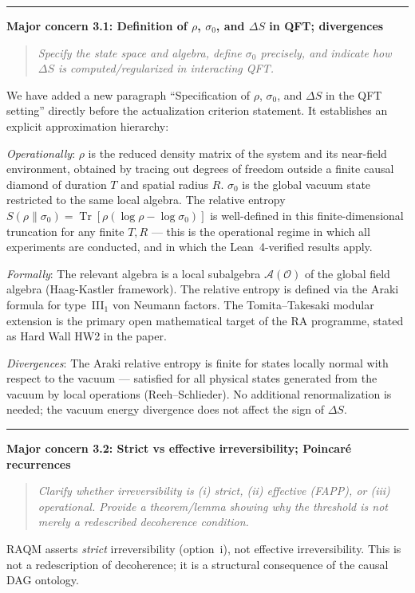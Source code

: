 \documentclass[11pt]{article}
\newcommand{\refereequote}[1]{%
  \begin{quote}\itshape\small #1\end{quote}}
\begin{document}
\bigskip\hrule\bigskip

\noindent\textbf{Major concern 3.1: Definition of $\rho$, $\sigma_0$,
and $\Delta S$ in QFT; divergences}

\refereequote{Specify the state space and algebra, define $\sigma_0$ precisely,
and indicate how $\Delta S$ is computed/regularized in interacting QFT.}

We have added a new paragraph ``Specification of $\rho$, $\sigma_0$, and
$\Delta S$ in the QFT setting'' directly before the actualization criterion
statement. It establishes an explicit approximation hierarchy:

\emph{Operationally}: $\rho$ is the reduced density matrix of the system and
its near-field environment, obtained by tracing out degrees of freedom outside
a finite causal diamond of duration $T$ and spatial radius $R$. $\sigma_0$
is the global vacuum state restricted to the same local algebra.
The relative entropy $S(\rho\|\sigma_0) = \operatorname{Tr}[\rho(\log\rho -
\log\sigma_0)]$ is well-defined in this finite-dimensional truncation for
any finite $T, R$ — this is the operational regime in which all experiments
are conducted, and in which the Lean~4-verified results apply.

\emph{Formally}: The relevant algebra is a local subalgebra $\mathcal{A}(\mathcal{O})$
of the global field algebra (Haag-Kastler framework). The relative entropy is
defined via the Araki formula for type~III$_1$ von Neumann factors. The
Tomita--Takesaki modular extension is the primary open mathematical target
of the RA programme, stated as Hard Wall HW2 in the paper.

\emph{Divergences}: The Araki relative entropy is finite for states locally
normal with respect to the vacuum — satisfied for all physical states generated
from the vacuum by local operations (Reeh--Schlieder). No additional
renormalization is needed; the vacuum energy divergence does not affect the
sign of $\Delta S$.

\bigskip\hrule\bigskip

\noindent\textbf{Major concern 3.2: Strict vs effective irreversibility;
Poincar\'{e} recurrences}

\refereequote{Clarify whether irreversibility is (i) strict, (ii) effective
(FAPP), or (iii) operational. Provide a theorem/lemma showing why the threshold
is not merely a redescribed decoherence condition.}

RAQM asserts \emph{strict} irreversibility (option~i), not effective
irreversibility. This is not a redescription of decoherence; it is a
structural consequence of the causal DAG ontology.
\end{document}
